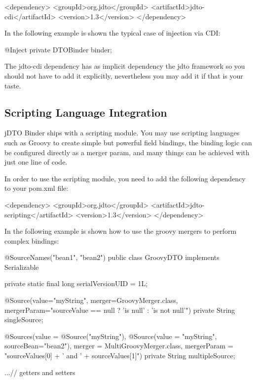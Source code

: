 \documentclass[11pt]{article}
\newcommand{\JDTO}{jDTO Binder\xspace}
\begin{document}

\begin{xml}
    <dependency>
        <groupId>org.jdto</groupId>
        <artifactId>jdto-cdi</artifactId>
        <version>1.3</version>
    </dependency>
\end{xml}

In the following example is shown the typical case of injection via CDI:


\begin{java}
@Inject
private DTOBinder binder;
\end{java}

The jdto-cdi dependency has as implicit dependency the jdto framework so you should not have to add it explicitly, nevertheless you may add it if that is your taste.

\subsection{Scripting Language Integration}

\JDTO ships with a scripting module. You may use scripting languages such as Groovy to create simple but powerful field bindings, the binding logic can be configured directly as a merger param, and many things can be achieved with just one line of code.

In order to use the scripting module, you need to add the following dependency to your pom.xml file:


\begin{xml}
    <dependency>
        <groupId>org.jdto</groupId>
        <artifactId>jdto-scripting</artifactId>
        <version>1.3</version>
    </dependency>
\end{xml}

In the following example is shown how to use the groovy mergers to perform complex bindings:


\begin{java}

@SourceNames({"bean1", "bean2"})
public class GroovyDTO implements Serializable {
    private static final long serialVersionUID = 1L;

    @Source(value="myString", merger=GroovyMerger.class, 
            mergerParam="sourceValue == null ? 'is null' : 'is not null'")
    private String singleSource;

    @Sources(value = {@Source("myString"), @Source(value = "myString", sourceBean="bean2")},
            merger = MultiGroovyMerger.class, 
            mergerParam = "sourceValues[0] + ' and ' + sourceValues[1]")
    private String multipleSource;

    ...// getters and setters

}

\end{java}
\end{document}
